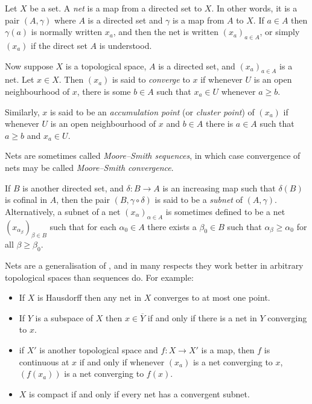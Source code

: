 \documentclass[12pt]{article}
\begin{document}

Let $X$ be a set.  A \emph{net} is a map from a directed set to $X$.
In other words, it is a pair $(A,\gamma)$
where $A$ is a directed set and $\gamma$ is a map from $A$ to $X$.
If $a\in A$ then $\gamma(a)$ is normally written $x_a$,
and then the net is written $(x_a)_{a\in A}$,
or simply $(x_a)$ if the direct set $A$ is understood.

Now suppose $X$ is a topological space, $A$ is a directed set,
and $(x_a)_{a\in A}$ is a net.  Let $x\in X$.
Then $(x_a)$ is said to \emph{converge} to $x$ if
whenever $U$ is an open neighbourhood of $x$,
there is some $b \in A$ such that $x_a \in U$ whenever $a \geq b$.

Similarly, $x$ is said to be an \emph{accumulation point} (or \emph{cluster point})
of $(x_a)$ if whenever $U$ is an open neighbourhood of $x$ and $b \in A$
there is $a \in A$ such that $a \geq b$ and $x_a \in U$.

Nets are sometimes called \emph{Moore--Smith sequences},
in which case convergence of nets may be called \emph{Moore--Smith convergence}.

If $B$ is another directed set,
and $\delta\colon B\rightarrow A$ is an increasing map
such that $\delta(B)$ is cofinal in $A$,
then the pair $(B, \gamma\circ\delta)$
is said to be a \emph{subnet} of $(A,\gamma)$.
Alternatively, a subnet of a net $(x_\alpha)_{\alpha\in A}$
is sometimes defined to be a net $(x_{\alpha_\beta})_{\beta\in B}$
such that for each $\alpha_0\in A$
there exists a $\beta_0\in B$
such that $\alpha_\beta\geq\alpha_0$ for all $\beta\geq\beta_0$.

Nets are a generalisation of ,
and in many respects they work better in arbitrary topological spaces
than sequences do. For example:

\begin{itemize}
\item
If $X$ is Hausdorff then any net in $X$ converges to at most one point.
\item
If $Y$ is a subspace of $X$
then $x\in\overline{Y}$ if and only if there is a net in $Y$ converging to $x$.
\item
if $X'$ is another topological space
and $f\colon X\rightarrow X'$ is a map,
then $f$ is continuous at $x$ if and only if
whenever $(x_a)$ is a net converging to $x$,
$(f(x_a))$ is a net converging to $f(x)$.
\item
$X$ is compact if and only if every net has a convergent subnet.
\end{itemize}
\end{document}
